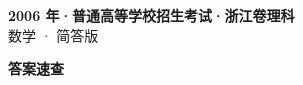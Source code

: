 \documentclass[zihao=-4, a4paper]{ctexart}
\begin{document}
\begin{center}
  {\Large\bfseries 2006 年·普通高等学校招生考试·浙江卷理科}\\[4pt]
  {\large 数学 · 简答版}
\end{center}
\medskip
{}

\clearpage
{}
\begin{center}{\Large\bfseries 答案速查}\end{center}
\medskip

\end{document}
